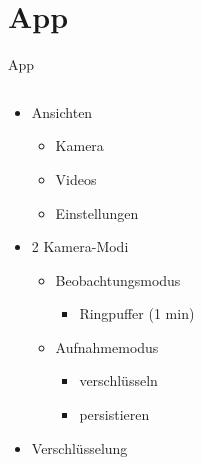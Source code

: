 \documentclass[19pt]{beamer}
\begin{document}
\section{App}
\begin{frame}{App}
  \begin{columns}[T]
    \begin{column}{.5\textwidth}
    		\begin{itemize}
    			\item Ansichten
			\begin{itemize}
				\item Kamera
				\item Videos
				\item Einstellungen
				\pause
			\end{itemize}
			\item 2 Kamera-Modi
			\begin{itemize}
				\item Beobachtungsmodus
				\begin{itemize}
					\item Ringpuffer (1 min)
				\end{itemize}
				\item Aufnahmemodus
				\begin{itemize}
					\item verschl\"usseln
					\item persistieren
				\end{itemize}
				\pause
			\end{itemize}
			\item Verschl\"usselung
    		\end{itemize}
    \end{column}
    \begin{column}{.5\textwidth}

\end{column}
\end{columns}
\end{frame}
\end{document}
